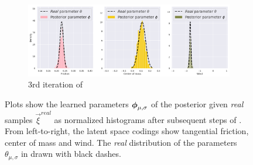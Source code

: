 \begin{figure}
\begin{subfigure}{\textwidth}
\end{subfigure}
\begin{subfigure}{\textwidth}
  \includegraphics[width=1.0\linewidth]{img/windyslope/latent-representation/latent_encoding_iter3}
  \caption{3rd iteration of \dettostoc{}}
\end{subfigure}
\caption{Plots show the learned parameters $\boldsymbol{\phi}_{\mu, \sigma}$ of the posterior given \emph{real} samples $\vec{\xi}^{real}$ as normalized histograms after subsequent steps of \dettostoc{}.
From left-to-right, the latent space codings show tangential friction, center of mass and wind. %
The \emph{real} distribution of the parameters $\theta_{\mu, \sigma}$ in drawn with black dashes.}
\label{fig:windyslope_latent_space_full}
\end{figure}

